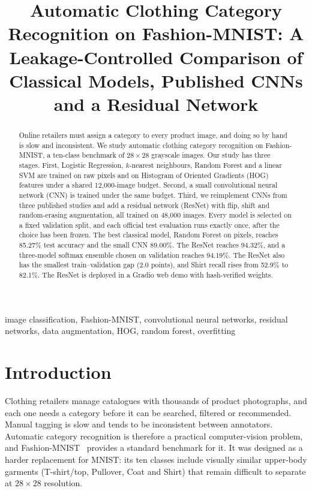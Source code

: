\documentclass[conference]{IEEEtran}
\begin{document}
\title{Automatic Clothing Category Recognition on Fashion-MNIST: A Leakage-Controlled Comparison of Classical Models, Published CNNs and a Residual Network}

\author{
}

\maketitle

\begin{abstract}
Online retailers must assign a category to every product image, and doing so by hand is slow and inconsistent. We study automatic clothing category recognition on Fashion-MNIST, a ten-class benchmark of $28\times28$ grayscale images. Our study has three stages. First, Logistic Regression, $k$-nearest neighbours, Random Forest and a linear SVM are trained on raw pixels and on Histogram of Oriented Gradients (HOG) features under a shared 12,000-image budget. Second, a small convolutional neural network (CNN) is trained under the same budget. Third, we reimplement CNNs from three published studies and add a residual network (ResNet) with flip, shift and random-erasing augmentation, all trained on 48,000 images. Every model is selected on a fixed validation split, and each official test evaluation runs exactly once, after the choice has been frozen. The best classical model, Random Forest on pixels, reaches 85.27\% test accuracy and the small CNN 89.00\%. The ResNet reaches 94.32\%, and a three-model softmax ensemble chosen on validation reaches 94.19\%. The ResNet also has the smallest train--validation gap (2.0 points), and Shirt recall rises from 52.9\% to 82.1\%. The ResNet is deployed in a Gradio web demo with hash-verified weights.
\end{abstract}

\begin{IEEEkeywords}
image classification, Fashion-MNIST, convolutional neural networks, residual networks, data augmentation, HOG, random forest, overfitting
\end{IEEEkeywords}

\section{Introduction}
Clothing retailers manage catalogues with thousands of product photographs, and each one needs a category before it can be searched, filtered or recommended. Manual tagging is slow and tends to be inconsistent between annotators. Automatic category recognition is therefore a practical computer-vision problem, and Fashion-MNIST~\cite{xiao2017fashion} provides a standard benchmark for it. It was designed as a harder replacement for MNIST: its ten classes include visually similar upper-body garments (T-shirt/top, Pullover, Coat and Shirt) that remain difficult to separate at $28\times28$ resolution.
\end{document}
